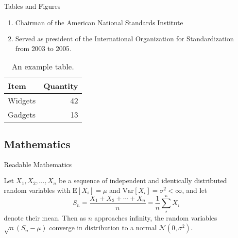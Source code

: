 \documentclass[aspectratio=169]{beamer}
\begin{document}
\begin{frame}{Tables and Figures}

\begin{enumerate}
    \item Chairman of the American National Standards Institute 
    \item Served as president of the International Organization for Standardization from 2003 to 2005.
\end{enumerate}


\begin{table}
\centering
\begin{tabular}{l|r}
Item & Quantity \\\hline
Widgets & 42 \\
Gadgets & 13
\end{tabular}
\caption{\label{tab:widgets}An example table.}
\end{table}

\end{frame}

\subsection{Mathematics}

\begin{frame}{Readable Mathematics}

Let $X_1, X_2, \ldots, X_n$ be a sequence of independent and identically distributed random variables with $\text{E}[X_i] = \mu$ and $\text{Var}[X_i] = \sigma^2 < \infty$, and let
\[ S_n = \frac{X_1 + X_2 + \cdots + X_n}{n}
      = \frac{1}{n}\sum_{i}^{n} X_i \]
denote their mean. Then as $n$ approaches infinity, the random variables $\sqrt{n}(S_n - \mu)$ converge in distribution to a normal $\mathcal{N}(0, \sigma^2)$.

\end{frame}
\end{document}
